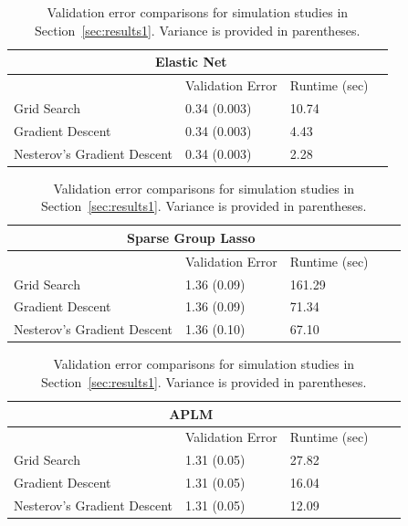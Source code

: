 \documentclass[10pt,letterpaper]{article}
\begin{document}
\begin{table} 
\begin{center}

\begin{tabular}{| l | l | l | l | }
\hline
\multicolumn{3}{|c|}{Elastic Net}\\
\hline
 & Validation Error & Runtime (sec) \\
\hline
Grid Search & 0.34 (0.003) & 10.74\\
\hline
Gradient Descent & 0.34 (0.003) & 4.43 \\
\hline
Nesterov's Gradient Descent & 0.34 (0.003) & 2.28 \\
\hline
\end{tabular}


\begin{tabular}{| l | l | l | l | l | }
\hline
\multicolumn{3}{|c|}{Sparse Group Lasso}\\
\hline
 & Validation Error & Runtime (sec) \\
\hline
Grid Search & 1.36 (0.09) & 161.29 \\
\hline
Gradient Descent  & 1.36 (0.09) & 71.34 \\
\hline
Nesterov's Gradient Descent  & 1.36 (0.10) & 67.10 \\
\hline
\end{tabular}

\begin{tabular}{| l | l | l | l | l | }
\hline
\multicolumn{3}{|c|}{APLM}\\
\hline
 & Validation Error & Runtime (sec) \\
\hline
Grid Search  & 1.31 (0.05) & 27.82 \\
\hline
Gradient Descent  & 1.31 (0.05) & 16.04 \\
\hline
Nesterov's Gradient Descent  & 1.31 (0.05) & 12.09 \\
\hline
\end{tabular}

\end{center}
\caption {Validation error comparisons for simulation studies in Section~\ref{sec:results1}. Variance is provided in parentheses.}
\label{table:validation}
\end{table}


\end{document}
